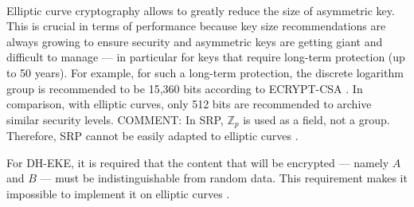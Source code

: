﻿\documentclass[../report.tex]{subfiles}
\begin{document}
\paragraph{} \label{sec:ecc_comparison}
Elliptic curve cryptography allows to greatly reduce the size of asymmetric key.
This is crucial in terms of performance because key size recommendations are always growing to ensure security and asymmetric keys are getting giant and difficult to manage --- in particular for keys that require long-term protection (up to 50 years). For example, for such a long-term protection, the discrete logarithm group is recommended to be 15,360 bits according to ECRYPT-CSA \cite{ECRYPT_Keylength}.
In comparison, with elliptic curves, only 512 bits are recommended to archive similar security levels.
COMMENT: 
In SRP, $\mathbb{Z}_p$ is used as a field, not a group. Therefore, SRP cannot be easily adapted to elliptic curves \cite{CAA}. %

For DH-EKE, it is required that the content that will be encrypted --- namely $A$ and $B$ --- must be indistinguishable from random data. 
This requirement makes it impossible to implement it on elliptic curves \cite{EKE_ECC}. %

\end{document}
